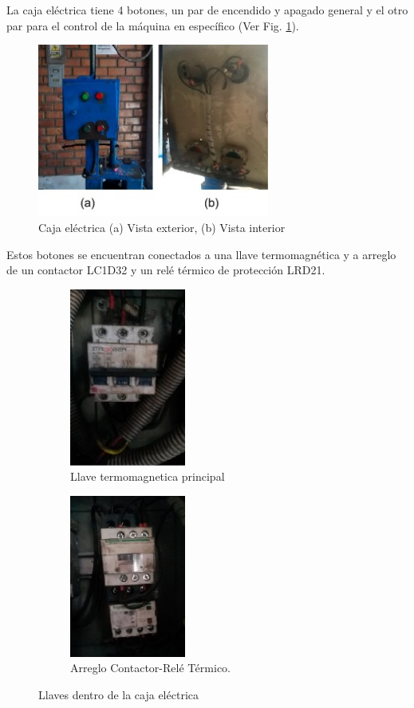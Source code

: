 \documentclass[main_conf.tex]{subfiles}
\begin{document}
La caja eléctrica tiene 4 botones, un par de encendido y
apagado general y el otro par para el control de la máquina en
específico (Ver Fig. \ref{caja_electrica_tapa}).

\begin{figure}[!t]
  \centering
  \includegraphics[width=3.0in]{../img/caja_electrica/tapa.jpg}
  \caption{Caja eléctrica (a) Vista exterior, (b) Vista interior}
  \label{caja_electrica_tapa}
\end{figure}

Estos botones se encuentran conectados a una llave termomagnética
y a arreglo de un contactor LC1D32 y un relé térmico de protección
LRD21.


\begin{figure}[t]
  \centering
  \begin{subfigure}[b]{0.5\textwidth}
    \centering
    \includegraphics[width=1.5in]{../img/caja_electrica/llave_a.png}
    \caption{Llave termomagnetica principal}
  \end{subfigure}

  \begin{subfigure}[b]{0.5\textwidth}
    \centering
    \includegraphics[width=1.5in]{../img/caja_electrica/llave_b.png}
    \caption{Arreglo Contactor-Relé Térmico.}
  \end{subfigure}

  \caption{Llaves dentro de la caja eléctrica}
  \label{caja_electrica_llaves}
\end{figure}
\end{document}
